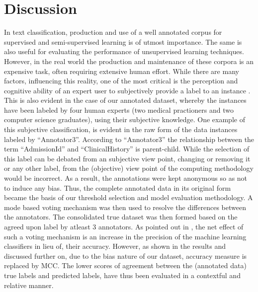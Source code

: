 \documentclass{ieeeaccess}
\begin{document}
\section{Discussion}
\label{discussion}
In text classification, production and use of a well annotated corpus for supervised and semi-supervised learning is of utmost importance. The same is also useful for evaluating the performance of unsupervised learning techniques. However, in the real world the production and maintenance of these corpora is an expensive task, often requiring extensive human effort. While there are many factors, influencing this reality, one of the most critical is the perception and cognitive ability of an expert user to subjectively provide a label to an instance \cite{reidsma2008exploiting, velupillai2010towards}. This is also evident in the case of our annotated dataset, whereby the instances have been labeled by four human experts (two medical practioners and two computer science graduates), using their subjective knowledge. One example of this subjective classification, is evident in the raw form of the data instances labeled by ``Annotator3''. According to ``Annotator3'' the relationship between the term ``AdmissionId'' and ``ClinicalHistory'' is parent-child. While the selection of this label can be debated from an subjective view point, changing or removing it or any other label, from the (objective) view point of the computing methodology would be incorrect\cite{pavlick2019inherent}. As a result, the annotations were kept anonymous so as not to induce any bias. Thus, the complete annotated data in its original form became the basis of our threshold selection and model evaluation methodology. A mode based voting mechanism was then used to resolve the differences between the annotators. The consolidated true dataset was then formed based on the agreed upon label by atleast 3 annotators. As pointed out in \cite{reidsma2008exploiting}, the net effect of such a voting mechanism is an increase in the precision of the machine learning classifiers in lieu of, their accuracy. However, as shown in the results and discussed further on, due to the bias nature of our dataset, accuracy measure is replaced by MCC. The lower scores of agreement between the (annotated data) true labels and predicted labels, have thus been evaluated in a contextful and relative manner.
\end{document}
